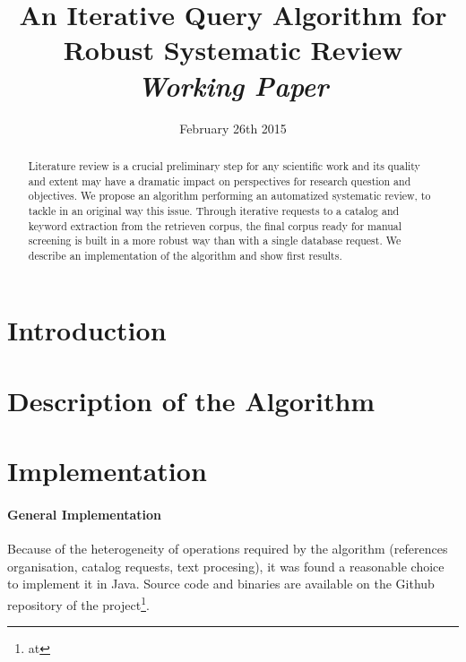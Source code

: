 


\title{An Iterative Query Algorithm for Robust Systematic Review\bigskip\\
\textit{Working Paper}
}
\author{}
\date{February 26th 2015}


\maketitle

\begin{abstract}
Literature review is a crucial preliminary step for any scientific work and its quality and extent may have a dramatic impact on perspectives for research question and objectives. We propose an algorithm performing an automatized systematic review, to tackle in an original way this issue. Through iterative requests to a catalog and keyword extraction from the retrieven corpus, the final corpus ready for manual screening is built in a more robust way than with a single database request. We describe an implementation of the algorithm and show first results.
\end{abstract}



\section{Introduction}


\section{Description of the Algorithm}



\section{Implementation}

\paragraph{General Implementation}
Because of the heterogeneity of operations required by the algorithm (references organisation, catalog requests, text procesing), it was found a reasonable choice to implement it in Java. Source code and binaries are available on the Github repository of the project\footnote{at \texttt{}}.



